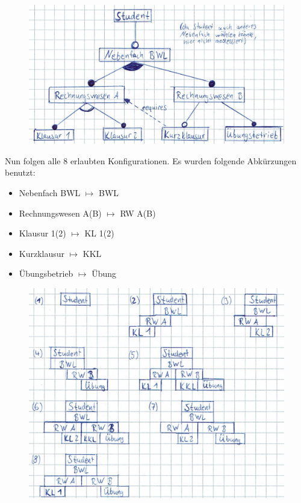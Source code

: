 \begin{figure}[h]
  \centering
  \includegraphics{1_featdiag}
\end{figure}

Nun folgen alle 8 erlaubten Konfigurationen. Es wurden folgende Abkürzungen benutzt:
\begin{itemize}
\item Nebenfach BWL $\mapsto$ BWL
\item Rechnungswesen A(B) $\mapsto$ RW A(B)
\item Klausur 1(2) $\mapsto$ KL 1(2)
\item Kurzklausur $\mapsto$ KKL
\item Übungsbetrieb $\mapsto$ Übung
\end{itemize}

\begin{figure}[h]
  \centering
  \includegraphics{1_config}
\end{figure}